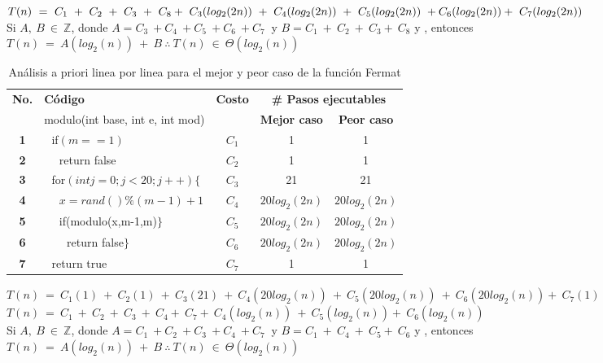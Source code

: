 \documentclass[12pt,twoside]{article}
\begin{document}
$T(n)~=~C_{1}~+~C_{2}~+~C_{3}~+~C_{8}+~C_{3}(log_2(2n))~+~C_{4}(log_2(2n))~+~C_{5}(log_2(2n))~+~\\C_{6}(log_2(2n))+~C_{7}(log_2(2n))$\\

Si $A,~B~\in~\mathbb Z$, donde $A=C_{3}~+C_{4}~+C_{5}~+C_{6}~+C_{7}~$ y $B=C_{1}~+~C_{2}~+~C_{3}+~C_{8}$ y , entonces $T(n)~=~A(log_2(n))~+~B~ \therefore~T(n)~\in~\Theta(log_2(n))$\\

\newpage
\begin{longtable}{||c|l|c|c|c||}
    \caption{An\'alisis a priori linea por linea para el mejor y peor caso de la funci\'on Fermat}\\
    \hline
        \multirow{2}{*}{\textbf{No.}} & \textbf{C\'odigo} & \multirow{2}{*}{\textbf{Costo}} & \multicolumn{2}{|c||}{\textbf{\# Pasos ejecutables}}\\
    \cline{2-2}\cline{4-5}
         & {modulo(int base, int e, int   mod)} & & \textbf{Mejor caso} & \textbf{Peor caso}\\
    \hline
    \textbf{1}&{\,\,\,\,if$(m==1)$}&{$C_{1}$}&{1}&{1}\\
    \hline
    \textbf{2}&{\,\,\,\,\,\,\,\,return false}&{$C_{2}$}&{1}&{1}\\
    \hline
    \textbf{3}&{\,\,\,\,for$(int j=0;j<20;j++)\{$}&{$C_{3}$}&{21}&{21}\\
    \hline
    \textbf{4}&{\,\,\,\,\,\,\,\,$x = rand() \% (m-1) +1 $}&{$C_{4}$}&{$20log_2(2n)$}&{$20log_2(2n)$}\\
    \hline
    \textbf{5}&{\,\,\,\,\,\,\,\,if(modulo(x,m-1,m)$\}$}&{$C_{5}$}&{$20log_2(2n)$}&{$20log_2(2n)$}\\
    \hline
    \textbf{6}&{\,\,\,\,\,\,\,\,\,\,\,\,return false$\}$}&{$C_{6}$}&{$20log_2(2n)$}&{$20log_2(2n)$}\\
    \hline
    \textbf{7}&{\,\,\,\,return true}&{$C_{7}$}&{1}&{1}\\
    \hline
\end{longtable}

$T(n)~=~C_{1}(1)~+~C_{2}(1)~+~C_{3}(21)~+~C_{4}(20log_2(n))~+~C_{5}(20log_2(n))~+~C_{6}(20log_2(n))+~C_{7}(1)$\\
$T(n)~=~C_{1}~+~C_{2}~+~C_{3}~+~C_{4}+~C_{7}+~C_{4}(log_2(n))~+~C_{5}(log_2(n))+~C_{6}(log_2(n))$\\
Si $A,~B~\in~\mathbb Z$, donde $A=C_{1}~+C_{2}~+C_{3}~+C_{4}~+C_{7}~$ y $B=C_{1}~+~C_{4}~+~C_{5}+~C_{6}$ y , entonces $T(n)~=~A(log_2(n))~+~B~ \therefore~T(n)~\in~\Theta(log_2(n))$\\
\end{document}
